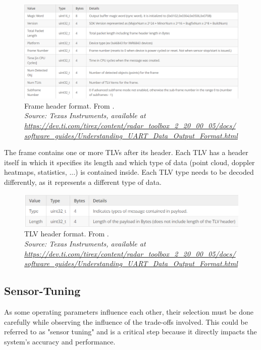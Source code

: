 \begin{figure}[!htbp]
    \centering
    \includegraphics[width=1.0\linewidth]{images/FrameFormatHeader.png}
    \caption{Frame header format. From \cite{mmwave_demo_output}.\\
    \textit{Source: Texas Instruments, available at \url{https://dev.ti.com/tirex/content/radar_toolbox_2_20_00_05/docs/software_guides/Understanding_UART_Data_Output_Format.html}}}
    \label{fig:Frame header format}
\end{figure}
\FloatBarrier\noindent
The frame contains one or more TLVs after its header.
Each TLV has a header itself in which it specifies its length and which type of data (point cloud, doppler heatmaps, statistics, ...) is contained inside.
Each TLV type needs to be decoded differently, as it represents a different type of data.
\begin{figure}[!htbp]
    \centering
    \includegraphics[width=0.95\linewidth]{images/TLVHeader.png}
    \caption{TLV header format. From \cite{mmwave_demo_output}.\\
    \textit{Source: Texas Instruments, available at \url{https://dev.ti.com/tirex/content/radar_toolbox_2_20_00_05/docs/software_guides/Understanding_UART_Data_Output_Format.html}}}
    \label{fig:TLV header format}
\end{figure}
\FloatBarrier

\subsection{Sensor-Tuning}
As some operating parameters influence each other, their selection must be done carefully while observing the influence of the trade-offs involved.
This could be referred to as "sensor tuning" and is a critical step because it directly impacts the system's accuracy and performance.

